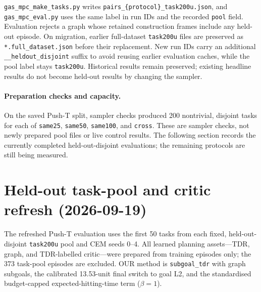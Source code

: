 \documentclass[11pt]{article}
\begin{document}
\texttt{gas\_mpc\_make\_tasks.py} writes
\texttt{pairs\_\{protocol\}\_task200u.json}, and
\texttt{gas\_mpc\_eval.py} uses the same label in run IDs and the recorded \texttt{pool}
field. Evaluation rejects a graph whose retained construction frames include any held-out
episode. On migration, earlier full-dataset \texttt{task200u} files are preserved as
\texttt{*.full\_dataset.json} before their replacement. New run IDs carry an additional
\texttt{\_\_heldout\_disjoint} suffix to avoid reusing earlier evaluation caches, while
the pool label stays \texttt{task200u}. Historical results remain preserved;
existing headline results do not become held-out results by changing the sampler.

\paragraph{Preparation checks and capacity.} On the saved Push-T split, sampler checks
produced 200 nontrivial, disjoint tasks for each of \texttt{same25}, \texttt{same50},
\texttt{same100}, and \texttt{cross}.
These are sampler checks, not newly prepared pool files or live control results. The following
section records the currently completed held-out-disjoint evaluations; the remaining protocols
are still being measured.

\section{Held-out task-pool and critic refresh (2026-09-19)}
\label{sec:task-critic-refresh}
The refreshed Push-T evaluation uses the first 50 tasks from each fixed, held-out-disjoint
\texttt{task200u} pool and CEM seeds 0--4.  All learned planning assets---TDR, graph, and
TDR-labelled critic---were prepared from training episodes only; the 373 task-pool episodes
are excluded.  OUR method is \texttt{subgoal\_tdr} with graph subgoals, the calibrated
13.53-unit final switch to goal L2, and the standardised budget-capped
expected-hitting-time term ($\beta=1$).
\end{document}
